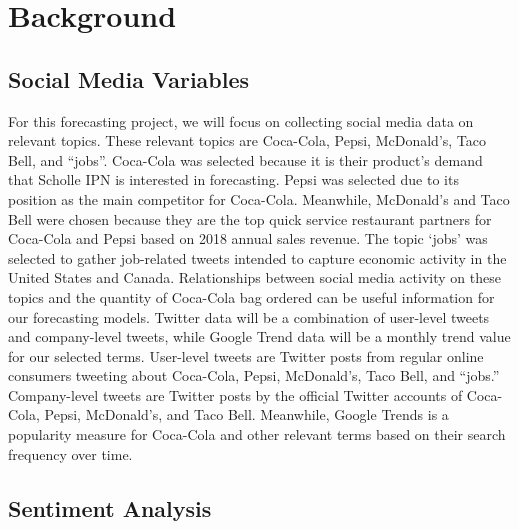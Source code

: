 \documentclass[12pt,oneside]{chicagocapstone}
\begin{document}
\chapter*{Background}\label{background}

\section*{Social Media Variables}\label{social-media-variables}

For this forecasting project, we will focus on collecting social media
data on relevant topics. These relevant topics are Coca-Cola, Pepsi,
McDonald's, Taco Bell, and ``jobs''. Coca-Cola was selected because it
is their product's demand that Scholle IPN is interested in forecasting.
Pepsi was selected due to its position as the main competitor for
Coca-Cola. Meanwhile, McDonald's and Taco Bell were chosen because they
are the top quick service restaurant partners for Coca-Cola and Pepsi
based on 2018 annual sales revenue. The topic `jobs' was selected to
gather job-related tweets intended to capture economic activity in the
United States and Canada. Relationships between social media activity on
these topics and the quantity of Coca-Cola bag ordered can be useful
information for our forecasting models. Twitter data will be a
combination of user-level tweets and company-level tweets, while Google
Trend data will be a monthly trend value for our selected terms.
User-level tweets are Twitter posts from regular online consumers
tweeting about Coca-Cola, Pepsi, McDonald's, Taco Bell, and ``jobs.''
Company-level tweets are Twitter posts by the official Twitter accounts
of Coca-Cola, Pepsi, McDonald's, and Taco Bell. Meanwhile, Google Trends
is a popularity measure for Coca-Cola and other relevant terms based on
their search frequency over time.

\section*{Sentiment Analysis}\label{sentiment-analysis}
\end{document}

